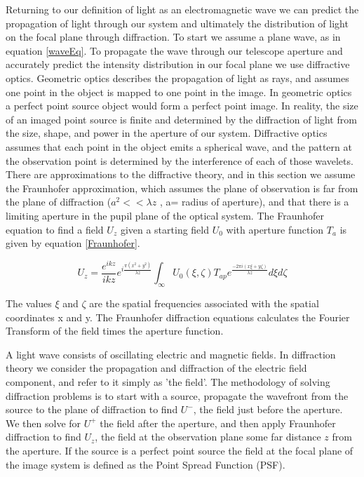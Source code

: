 Returning to our definition of light as an electromagnetic wave we can predict the propagation of light through our system and ultimately the distribution of light on the focal plane through diffraction. To start we assume a plane wave, as in equation \ref{waveEq}. To propagate the wave through our telescope aperture and accurately predict the intensity distribution in our focal plane we use diffractive optics. Geometric optics describes the propagation of light as rays, and assumes one point in the object is mapped to one point in the image. In geometric optics a perfect point source object would form a perfect point image. In reality, the size of an imaged point source is finite and determined by the diffraction of light from the size, shape, and power in the aperture of our system. Diffractive optics assumes that each point in the object emits a spherical wave, and the pattern at the observation point is determined by the interference of each of those wavelets. There are approximations to the diffractive theory, and in this section we assume the Fraunhofer approximation, which assumes the plane of observation is far from the plane of diffraction ($a^2 << \lambda z$ , a= radius of aperture), and that there is a limiting aperture in the pupil plane of the optical system. The Fraunhofer equation to find a field $U_z$ given a starting field $U_0$ with aperture function $T_{a}$ is given by equation \ref{Fraunhofer}.

\begin{equation}
U_z=\frac{e^{ikz}}{ikz}e^{i\frac{\pi (x^2+y^2)}{\lambda z}}\int_{\infty} U_0(\xi,\zeta)T_{ap}e^{\frac{-2\pi i(x\xi+y\zeta)}{\lambda z}}d\xi d\zeta
\label{Fraunhofer}
\end{equation}

The values $\xi$ and $\zeta$ are the spatial frequencies associated with the spatial coordinates x and y. The Fraunhofer diffraction equations calculates the Fourier Transform of the field times the aperture function.

A light wave consists of oscillating electric and magnetic fields. In diffraction theory we consider the propagation and diffraction of the electric field component, and refer to it simply as 'the field'. The methodology of solving diffraction problems is to start with a source, propagate the wavefront from the source to the plane of diffraction to find $U^-$, the field just before the aperture. We then solve for $U^+$ the field after the aperture, and then apply Fraunhofer diffraction to find $U_z$, the field at the observation plane some far distance $z$ from the aperture. If the source is a perfect point source the field at the focal plane of the image system is defined as the Point Spread Function (PSF).

